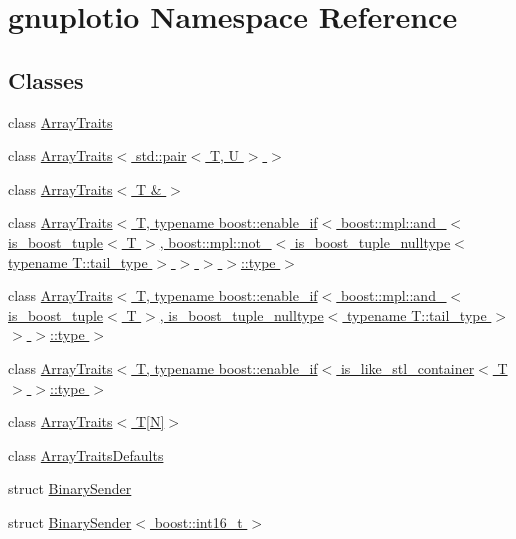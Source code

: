 \hypertarget{namespacegnuplotio}{}\section{gnuplotio Namespace Reference}
\label{namespacegnuplotio}
\subsection*{Classes}
\begin{DoxyCompactItemize}
\item 
class \hyperlink{classgnuplotio_1_1_array_traits}{Array\+Traits}
\item 
class \hyperlink{classgnuplotio_1_1_array_traits_3_01std_1_1pair_3_01_t_00_01_u_01_4_01_4}{Array\+Traits$<$ std\+::pair$<$ T, U $>$ $>$}
\item 
class \hyperlink{classgnuplotio_1_1_array_traits_3_01_t_01_6_01_4}{Array\+Traits$<$ T \& $>$}
\item 
class \hyperlink{classgnuplotio_1_1_array_traits_3_01_t_00_01typename_01boost_1_1enable__if_3_01boost_1_1mpl_1_1a8de3a8fe198d85f7f5d28b9a2f5bf229}{Array\+Traits$<$ T, typename boost\+::enable\+\_\+if$<$ boost\+::mpl\+::and\+\_\+$<$ is\+\_\+boost\+\_\+tuple$<$ T $>$, boost\+::mpl\+::not\+\_\+$<$ is\+\_\+boost\+\_\+tuple\+\_\+nulltype$<$ typename T\+::tail\+\_\+type $>$ $>$ $>$ $>$\+::type $>$}
\item 
class \hyperlink{classgnuplotio_1_1_array_traits_3_01_t_00_01typename_01boost_1_1enable__if_3_01boost_1_1mpl_1_1ad3fa8e75dccbaae12a06d17831678a88}{Array\+Traits$<$ T, typename boost\+::enable\+\_\+if$<$ boost\+::mpl\+::and\+\_\+$<$ is\+\_\+boost\+\_\+tuple$<$ T $>$, is\+\_\+boost\+\_\+tuple\+\_\+nulltype$<$ typename T\+::tail\+\_\+type $>$ $>$ $>$\+::type $>$}
\item 
class \hyperlink{classgnuplotio_1_1_array_traits_3_01_t_00_01typename_01boost_1_1enable__if_3_01is__like__stl__co9e1736bbd08cd58c6993ab613a998887}{Array\+Traits$<$ T, typename boost\+::enable\+\_\+if$<$ is\+\_\+like\+\_\+stl\+\_\+container$<$ T $>$ $>$\+::type $>$}
\item 
class \hyperlink{classgnuplotio_1_1_array_traits_3_01_t[_n]_4}{Array\+Traits$<$ T\mbox{[}\+N\mbox{]}$>$}
\item 
class \hyperlink{classgnuplotio_1_1_array_traits_defaults}{Array\+Traits\+Defaults}
\item 
struct \hyperlink{structgnuplotio_1_1_binary_sender}{Binary\+Sender}
\item 
struct \hyperlink{structgnuplotio_1_1_binary_sender_3_01boost_1_1int16__t_01_4}{Binary\+Sender$<$ boost\+::int16\+\_\+t $>$}

\end{DoxyCompactItemize}
